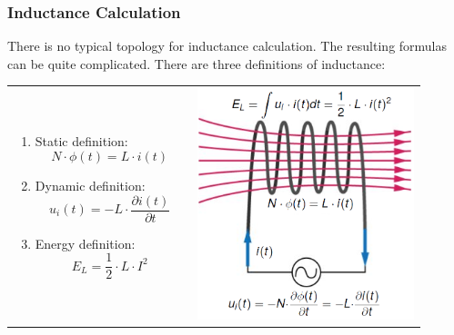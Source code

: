 \documentclass{beamer}
\begin{document}
	\begin{frame}
    \frametitle{Inductance Calculation}
		There is no typical topology for inductance calculation. The resulting formulas can be quite complicated. There are three definitions of inductance:
		\begin{tabular}{m{0.4\linewidth} m{0.5\linewidth}}
		\begin{enumerate}
			\item Static definition: $$N\cdot \phi(t)= L\cdot i(t)$$
			\item Dynamic definition: $$u_i(t)=-L\cdot \frac{\partial i(t)}{\partial t}$$
			\item Energy definition: $$E_L= \frac{1}{2}\cdot L\cdot I^2$$
		\end{enumerate}
		& \includegraphics[scale=0.28]{obr01_defIndukcnosti.png}
		\end{tabular}
	\end{frame}
\end{document}
